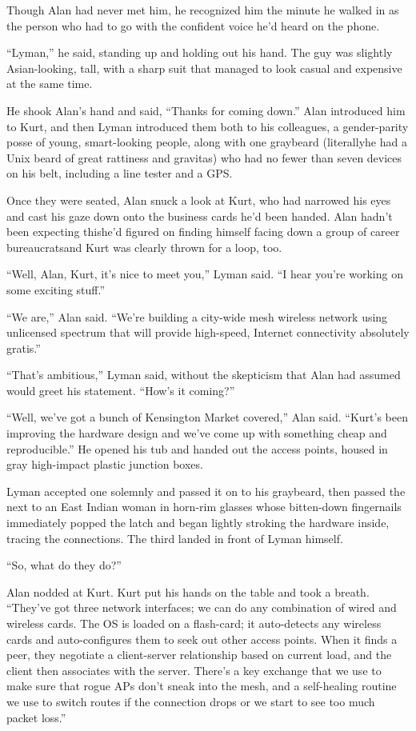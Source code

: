 Though Alan had never met him, he recognized him the minute he walked
in as the person who had to go with the confident voice he'd heard on
the phone.

``Lyman,'' he said, standing up and holding out his hand.  The guy was
slightly Asian-looking, tall, with a sharp suit that managed to look
casual and expensive at the same time.

He shook Alan's hand and said, ``Thanks for coming down.'' Alan
introduced him to Kurt, and then Lyman introduced them both to his
colleagues, a gender-parity posse of young, smart-looking people,
along with one graybeard (literally\dash{}he had a Unix beard of great
rattiness and gravitas) who had no fewer than seven devices on his
belt, including a line tester and a GPS.

Once they were seated, Alan snuck a look at Kurt, who had narrowed his
eyes and cast his gaze down onto the business cards he'd been handed. 
Alan hadn't been expecting this\dash{}he'd figured on finding himself
facing down a group of career bureaucrats\dash{}and Kurt was clearly
thrown for a loop, too.

``Well, Alan, Kurt, it's nice to meet you,'' Lyman said.  ``I hear
you're working on some exciting stuff.''

``We are,'' Alan said.  ``We're building a city-wide mesh wireless
network using unlicensed spectrum that will provide high-speed,
Internet connectivity absolutely gratis.''

``That's ambitious,'' Lyman said, without the skepticism that Alan had
assumed would greet his statement.  ``How's it coming?''

``Well, we've got a bunch of Kensington Market covered,'' Alan said. 
``Kurt's been improving the hardware design and we've come up with
something cheap and reproducible.'' He opened his tub and handed out
the access points, housed in gray high-impact plastic junction boxes.

Lyman accepted one solemnly and passed it on to his graybeard, then
passed the next to an East Indian woman in horn-rim glasses whose
bitten-down fingernails immediately popped the latch and began lightly
stroking the hardware inside, tracing the connections.  The third
landed in front of Lyman himself.

``So, what do they do?''

Alan nodded at Kurt.  Kurt put his hands on the table and took a
breath.  ``They've got three network interfaces; we can do any
combination of wired and wireless cards.  The OS is loaded on a
flash-card; it auto-detects any wireless cards and auto-configures
them to seek out other access points.  When it finds a peer, they
negotiate a client-server relationship based on current load, and the
client then associates with the server.  There's a key exchange that
we use to make sure that rogue APs don't sneak into the mesh, and a
self-healing routine we use to switch routes if the connection drops
or we start to see too much packet loss.''

